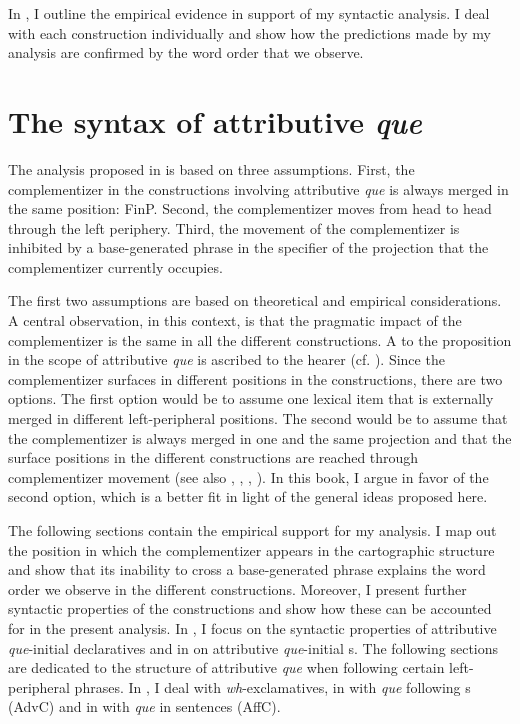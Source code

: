 In  , I outline the empirical evidence in support of my syntactic analysis. I deal with each construction individually and show  how the predictions made by my analysis are confirmed by the word order that we observe. 
\section{The syntax of attributive \emph{que}}\label{sec:presupsyn}
The analysis proposed in  is based on three assumptions. First,   the complementizer in the  constructions involving attributive \emph{que} is always merged in the same position: FinP. Second,  the complementizer moves from head to head through the left periphery. Third,  the movement of the complementizer  is inhibited by a base-generated phrase in the specifier of the  projection that the complementizer currently occupies. 

The first two assumptions are  based on  theoretical and empirical considerations. A central  observation, in this context, is that the pragmatic impact of  the complementizer is the same in all the different constructions. A  to the proposition in the scope of attributive \emph{que} is ascribed to the hearer (cf. ). Since the complementizer surfaces in different positions in the constructions, there are  two options. The first option would be to assume one lexical item that is externally merged in different left-peripheral positions. The second  would be to assume that the complementizer is always merged in one and the same projection and that the surface  positions in the different constructions are reached through complementizer movement (see also \citealt{Rizzi1997}, \citealt{Poletto2000}, \citealt{Roberts2001}, \citealt{Ledgeway2005}). In this book, I argue in favor of the second option, which  is a better fit in light of the general ideas proposed here. 




The following sections contain the empirical support for my analysis. I map out the position in which the complementizer appears in the cartographic structure and   show that its inability  to cross a base-generated phrase explains  the word order we observe in the different constructions. Moreover, I present further syntactic properties of the  constructions and show how these can be accounted for in the present analysis. In , I focus on the syntactic properties of attributive \emph{que}-initial declaratives and in  on attributive \emph{que}-initial s. The following sections are dedicated to the structure of attributive \emph{que} when following certain left-peripheral phrases. In , I deal with  \textit{wh}-exclamatives, in  with \emph{que} following s (AdvC) and in  with \emph{que} in  sentences (AffC).

